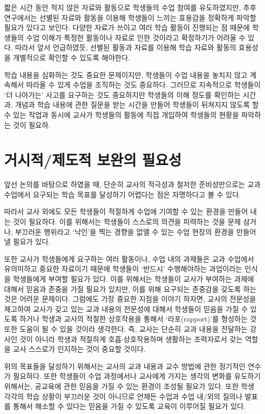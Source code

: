 \documentclass[10pt, a4paper, chapter]{oblivoir}
\begin{document}
    짧은 시간 동안 적지 않은 자료와 활동으로 학생들의 수업 참여를 유도하였지만, 추후 연구에서는 
    선별된 자료와 활동을 이용해 학생들이 느끼는 효용감을 정확하게 파악할 필요가 있다고 보인다. 
    다양한 자료가 쓰이고 여러 학습 활동이 진행되는 점 때문에 학생들의 수업 이해가 특정한 활동이나 자료로
    인한 것이라고 확정하기가 어려울 수 있다. 따라서 앞서 언급하였듯, 선별된 활동과 자료를 이용해 
    학습 자료와 활동의 효용성을 개별적으로 확인할 수 있도록 해야한다. 

    학습 내용을 심화하는 것도 중요한 문제이지만, 학생들이 수업 내용을 놓치지 않고 계속해서 따라올
     수 있게 수업을 조직하는 것도 중요하다. 그러므로 지속적으로 학생들이 `더 나아가는' 사고를 
    요구하는 것도 중요하지만 학생들의 이해 정도를 확인하는 시간과, 개념과 학습 내용에 관한 질문을
    받는 시간을 만들어 학생들이 뒤쳐지지 않도록 할 수 있는 작업과 동시에 교사가 학생들의 활동에 직접 개입하여 학생들의 현황을
파악하는 것이 필요하. 

    \section{거시적/제도적 보완의 필요성}

    앞선 논의를 바탕으로 하였을 때, 단순히 교사의 적극성과 철저한 준비성만으로는 교과 수업에서 요구되는 학습 목표를 달성하기 어렵다는 점은 자명하다고 볼 수 있다.

    따라서 교사 외에도 모든 학생들이 적절하게 수업에 기여할 수 있는 환경을 만들어 내는 것이 필요하다. 
    이를 위해서는 학생들이 스스로의 의견을 피력하는 것을 문제 삼거나, 부끄러운 행위라고 `낙인'을 찍는
    경향을 없앨 수 있는 수업 현장의 환경을 만들어낼 필요가 있다. 

    또한 교사가 학생들에게 요구하는 여러 활동이나, 수업 내의 과제들은 교과 수업에서 유의미하고 
    중요한 자료이기 때문에 학생들이 `반드시' 수행해야하는 과업이라는 인식을 학생들에게 부여할 필요가 있다. 
    이를 위해서는 학생들이 교사가 부여하는 과제에 대해서 믿음과 존중을 가질 필요가 있지만, 이를 위해 요구되는 존중감을 갖도록 하는 것은 어려운 문제이다. 
    그럼에도 가장 중요한 지점을 이야기 하자면, 교사의 전문성을 제고하여 교사가 갖고 있는 
    교과 내용의 전문성에 대해서 학생들이 믿음을 가질 수 있도록 하거나 학생과 교사의 적절한 상호작용을 통해서 `라포(rapport)'를 형성하는 것 또한 도움이 될 수 있을 것이라 생각한다. 즉, 교사는 단순히 교과 내용을 전달하는 강사인 것이 아니라
    학생과 적절하게 호흡$\cdot$상호작용하며 생활하는 조력자로서 갖는 역할을 교사 스스로가 
    인지하는 것이 중요할 것이다. 

    위의 목표들을 달성하기 위해서는 교사의 교과 내용과 교수 방법에 관한 정기적인 연수가 필요하다. 또한 학생들이 수업 과정에서나 교사에게 가지는 생각의 변화를 유도하기 위해서는, 공교육에 관한 
    믿음을 가질 수 있는 환경이 조성될 필요가 있다. 또한 학생 각각의 학습 상황이 부끄러운 것이 아니므로
    언제든 수업과 수업 내/외의 질의나 발표를 통해서 해소할 수 있다는 믿음을 가질 수 있도록 교육이 이루어질 필요가 있다. 
    
\end{document}
